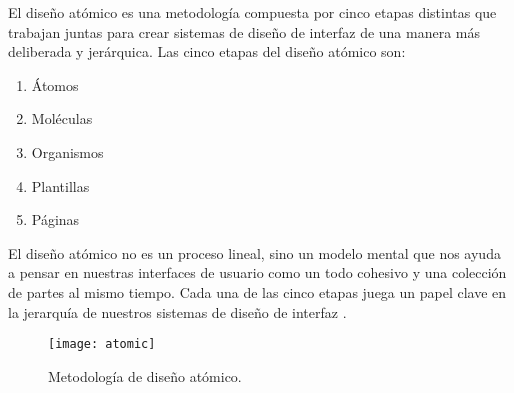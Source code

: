 El diseño atómico es una metodología compuesta por cinco etapas distintas que trabajan juntas para crear sistemas de diseño de interfaz de una manera más deliberada y jerárquica. Las cinco etapas del diseño atómico son:
\vspace{0.8cm}

\begin{enumerate}
  \item Átomos
  \item Moléculas
  \item Organismos
  \item Plantillas
  \item Páginas
\end{enumerate}
\vspace{0.8cm}

El diseño atómico no es un proceso lineal, sino un modelo mental que nos ayuda a pensar en nuestras interfaces de usuario como un todo cohesivo y una colección de partes al mismo tiempo. Cada una de las cinco etapas juega un papel clave en la jerarquía de nuestros sistemas de diseño de interfaz \cite{frost}.
\vspace{0.8cm}


\begin{figure}[H]
  \centering
  \texttt{[image: atomic]}
  \caption{Metodología de diseño atómico.}
\end{figure}